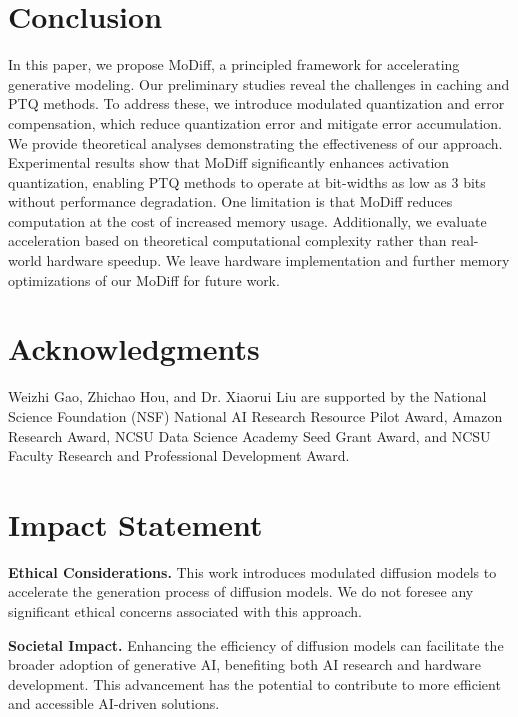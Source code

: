 \section{Conclusion}
\label{sec:conslusion}

In this paper, we propose MoDiff, a principled framework for accelerating generative modeling. Our preliminary studies reveal the challenges in caching and PTQ methods. To address these, we introduce modulated quantization and error compensation, which reduce quantization error and mitigate error accumulation. We provide theoretical analyses demonstrating the effectiveness of our approach. Experimental results show that MoDiff significantly enhances activation quantization, enabling PTQ methods to operate at bit-widths as low as 3 bits without performance degradation. One limitation is that MoDiff reduces computation at the cost of increased memory usage. Additionally, we evaluate acceleration based on theoretical computational complexity rather than real-world hardware speedup. We leave hardware implementation and further memory optimizations of our MoDiff for future work.

\newpage

\section*{Acknowledgments}

Weizhi Gao, Zhichao Hou, and Dr. Xiaorui Liu are supported by the National Science Foundation (NSF) National AI Research Resource Pilot Award, Amazon Research Award, NCSU Data Science Academy Seed Grant Award, and NCSU Faculty Research and Professional Development Award. 

\section*{Impact Statement}
\textbf{Ethical Considerations.} This work introduces modulated diffusion models to accelerate the generation process of diffusion models. We do not foresee any significant ethical concerns associated with this approach.

\textbf{Societal Impact.} Enhancing the efficiency of diffusion models can facilitate the broader adoption of generative AI, benefiting both AI research and hardware development. This advancement has the potential to contribute to more efficient and accessible AI-driven solutions.
